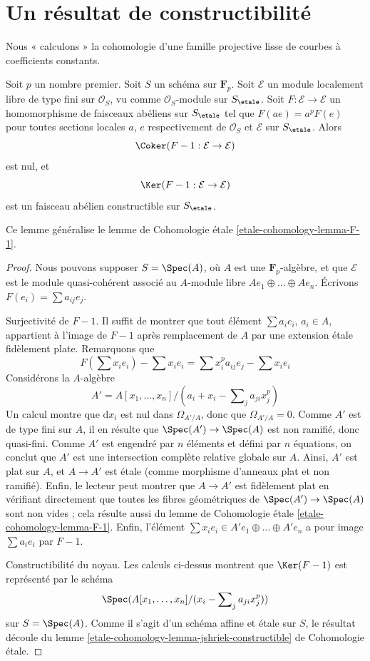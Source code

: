 \section{Un résultat de constructibilité}
\label{section-family-smooth-curves-cohomology}

\noindent
Nous « calculons » la cohomologie d'une famille projective lisse
de courbes à coefficients constants.

\begin{lemma}
\label{lemma-frobenius-linear-on-vb}
Soit $p$ un nombre premier. Soit $S$ un schéma sur $\mathbf{F}_p$.
Soit $\mathcal{E}$ un module localement libre de type fini
sur $\mathcal{O}_S$, vu comme $\mathcal{O}_S$-module sur $S_\etale$.
Soit $F : \mathcal{E} \to \mathcal{E}$ un homomorphisme de faisceaux abéliens
sur $S_\etale$ tel que $F(a e) = a^pF(e)$ pour toutes sections locales $a$, $e$
respectivement de $\mathcal{O}_S$ et $\mathcal{E}$ sur $S_\etale$. Alors
$$
\Coker(F - 1 : \mathcal{E} \to \mathcal{E})
$$
est nul, et
$$
\Ker(F - 1 : \mathcal{E} \to \mathcal{E})
$$
est un faisceau abélien constructible sur $S_\etale$.
\end{lemma}

\noindent
Ce lemme généralise le lemme de Cohomologie étale
\ref{etale-cohomology-lemma-F-1}.

\begin{proof}
Nous pouvons supposer $S = \Spec(A)$, où $A$ est une $\mathbf{F}_p$-algèbre,
et que $\mathcal{E}$ est le module quasi-cohérent associé
au $A$-module libre $Ae_1 \oplus \ldots \oplus Ae_n$.
Écrivons $F(e_i) = \sum a_{ij} e_j$.

\medskip\noindent
Surjectivité de $F - 1$. Il suffit de montrer que tout élément
$\sum a_i e_i$, $a_i \in A$, appartient à l'image de $F - 1$
après remplacement de $A$ par une extension étale fidèlement plate.
Remarquons que
$$
F(\sum x_ie_i) - \sum x_i e_i = \sum x_i^p a_{ij} e_j - \sum x_i e_i
$$
Considérons la $A$-algèbre
$$
A' = A[x_1, \ldots, x_n]/(a_i + x_i - \sum\nolimits_j a_{ji} x_j^p)
$$
Un calcul montre que $\text{d}x_i$ est nul dans $\Omega_{A'/A}$,
donc que $\Omega_{A'/A} = 0$. Comme $A'$ est de type fini sur
$A$, il en résulte que $\Spec(A') \to \Spec(A)$ est non ramifié,
donc quasi-fini. Comme $A'$ est engendré par $n$ éléments
et défini par $n$ équations, on conclut que $A'$
est une intersection complète relative globale sur $A$.
Ainsi, $A'$ est plat sur $A$, et $A \to A'$
est étale (comme morphisme d'anneaux plat et non ramifié). Enfin,
le lecteur peut montrer que $A \to A'$ est fidèlement plat
en vérifiant directement que toutes les fibres géométriques de
$\Spec(A') \to \Spec(A)$ sont non vides ; cela résulte aussi du lemme de
Cohomologie étale
\ref{etale-cohomology-lemma-F-1}.
Enfin, l'élément $\sum x_i e_i \in A'e_1 \oplus \ldots \oplus A'e_n$
a pour image $\sum a_i e_i$ par $F - 1$.

\medskip\noindent
Constructibilité du noyau. Les calculs ci-dessus montrent que
$\Ker(F - 1)$ est représenté par le schéma
$$
\Spec(A[x_1, \ldots, x_n]/(x_i - \sum\nolimits_j a_{ji} x_j^p))
$$
sur $S = \Spec(A)$. Comme il s'agit d'un schéma affine et étale
sur $S$, le résultat découle du
lemme \ref{etale-cohomology-lemma-jshriek-constructible} de Cohomologie étale.
\end{proof}

